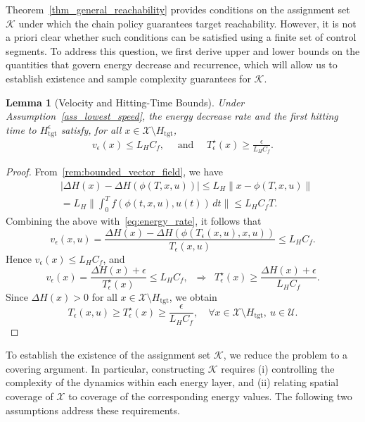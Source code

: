 \documentclass[letterpaper, 10 pt, conference]{ieeeconf}
\newtheorem{lemma}{Lemma}
\newcommand{\tgt}{\mathrm{tgt}}
\begin{document}
Theorem~\ref{thm_general_reachability} provides conditions on the assignment set $\mathcal{K}$ under which the chain policy guarantees target reachability. However, it is not a priori clear whether such conditions can be satisfied using a finite set of control segments. To address this question, we first derive upper and lower bounds on the quantities that govern energy decrease and recurrence, which will allow us to establish existence and sample complexity guarantees for $\mathcal{K}$.

\begin{lemma}[Velocity and Hitting-Time Bounds]
\label{lemma:lower_bound_time}
Under Assumption~\ref{ass_lowest_speed}, the energy decrease rate and the first hitting time to $H_{\tgt}^\epsilon$ satisfy, for all $x \in \mathcal{X}\setminus H_{\tgt}$,
\begin{align*}
v_\epsilon(x) \le L_H C_f, \quad\text{ and }\quad
T_\epsilon^\star(x) \ge \frac{\epsilon}{L_H C_f}.
\end{align*}
\end{lemma}

\begin{proof}
From~\eqref{rem:bounded_vector_field}, we have
\begin{align*}
&|\Delta H(x) - \Delta H(\phi(T,x,u))|
\le L_H \|x - \phi(T,x,u)\| \\
&= L_H \Big\|\int_0^T f(\phi(t,x,u),u(t))\,dt\Big\|
\le L_H C_f T.
\end{align*}
Combining the above with~\eqref{eq:energy_rate}, it follows that
\[
v_\epsilon(x,u) = \frac{\Delta H(x)-\Delta H(\phi(T_\epsilon(x,u),x,u))}{T_\epsilon(x,u)} \le L_H C_f.
\]
Hence $v_\epsilon(x)\le L_H C_f$, and
\[
v_\epsilon(x)=\frac{\Delta H(x)+\epsilon}{T_\epsilon^\star(x)} \le L_H C_f,
\;\; \Rightarrow \;\;
T_\epsilon^\star(x)\ge \frac{\Delta H(x)+\epsilon}{L_H C_f}.
\]
Since $\Delta H(x)>0$ for all $x\in \mathcal{X}\setminus H_{\tgt}$, we obtain
\[
T_\epsilon(x,u)\ge T_\epsilon^\star(x)\ge \frac{\epsilon}{L_H C_f},
\quad \forall x\in\mathcal{X}\setminus H_{\tgt},\ u\in\mathcal{U}.
\]
\end{proof}

To establish the existence of the assignment set $\mathcal{K}$, we reduce the problem to a covering argument. In particular, constructing $\mathcal{K}$ requires (i) controlling the complexity of the dynamics within each energy layer, and (ii) relating spatial coverage of $\mathcal{X}$ to coverage of the corresponding energy values. The following two assumptions address these requirements.
\end{document}

